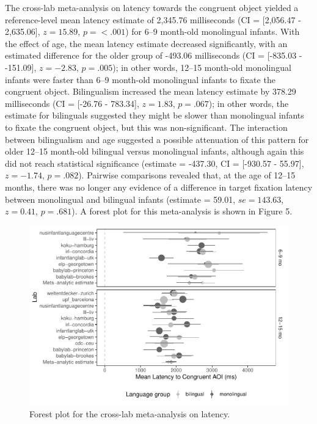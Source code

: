 \documentclass[,man,floatsintext]{apa6}
\begin{document}
The cross-lab meta-analysis on latency towards the congruent object yielded a reference-level mean latency estimate of 2,345.76 milliseconds (CI = {[}2,056.47 - 2,635.06{]}, \(z = 15.89\), \(p = < .001\)) for 6--9 month-old monolingual infants. With the effect of age, the mean latency estimate decreased significantly, with an estimated difference for the older group of -493.06 milliseconds (CI = {[}-835.03 - -151.09{]}, \(z = -2.83\), \(p = .005\)); in other words, 12--15 month-old monolingual infants were faster than 6--9 month-old monolingual infants to fixate the congruent object. Bilingualism increased the mean latency estimate by 378.29 milliseconds (CI = {[}-26.76 - 783.34{]}, \(z = 1.83\), \(p = .067\)); in other words, the estimate for bilinguals suggested they might be slower than monolingual infants to fixate the congruent object, but this was non-significant. The interaction between bilingualism and age suggested a possible attenuation of this pattern for older 12--15 month-old bilingual versus monolingual infants, although again this did not reach statistical significance (estimate = -437.30, CI = {[}-930.57 - 55.97{]}, \(z = -1.74\), \(p = .082\)). Pairwise comparisons revealed that, at the age of 12--15 months, there was no longer any evidence of a difference in target fixation latency between monolingual and bilingual infants (estimate = 59.01, \(se = 143.63\), \(z = 0.41\), \(p = .681\)). A forest plot for this meta-analysis is shown in Figure 5.

\begin{figure}
\centering
\includegraphics{gaze-following-paper_files/figure-latex/fig5-1.pdf}
\caption{\label{fig:fig5}Forest plot for the cross-lab meta-analysis on latency.}
\end{figure}
\end{document}
